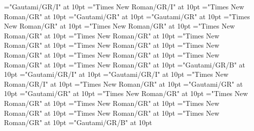 \documentclass[a4paper]{article}
\begin{document}
\font\spanggoTeluINexampleggoTeluINxitemexamplessensesensesentryletData="Gautami/GR/I" at 10pt
\font\spanenexampleggoTeluINxitemexamplessensesensesentryletData="Times New Roman/GR/I" at 10pt
\font\translationsxitemexamplessensesensesentryletData="Times New Roman/GR" at 10pt
\font\translationLdtetranslationsxitemexamplessensesensesentryletData="Gautami/GR" at 10pt
\font\spantetranslationLdtetranslationsxitemexamplessensesensesentryletData="Gautami/GR" at 10pt
\font\spanentranslationLdtetranslationsxitemexamplessensesensesentryletData="Times New Roman/GR" at 10pt
\font\spanenexamplessensesensesentryletData="Times New Roman/GR" at 10pt
\font\primaryrefsentryletData="Times New Roman/GR" at 10pt
\font\spanenprimaryrefsentryletData="Times New Roman/GR" at 10pt
\font\entryreftypeprimaryrefsentryletData="Times New Roman/GR" at 10pt
\font\LexEntryTypepublishStemEntryTypeAbbreviationPubenentryreftypeprimaryrefsentryletData="Times New Roman/GR" at 10pt
\font\spanenLexEntryTypepublishStemEntryTypeAbbreviationPubenentryreftypeprimaryrefsentryletData="Times New Roman/GR" at 10pt
\font\spanenentryreftypeprimaryrefsentryletData="Times New Roman/GR" at 10pt
\font\entryrefcomponentprimaryrefsentryletData="Times New Roman/GR" at 10pt
\font\aentryrefcomponentprimaryrefsentryletData="Times New Roman/GR" at 10pt
\font\LexEntrypublishStemComponentTargetHeadWordRefggoTeluINaentryrefcomponentprimaryrefsentryletData="Gautami/GR/B" at 10pt
\font\exampleggoTeluINexamplessensesensesentryletData="Gautami/GR/I" at 10pt
\font\spanggoTeluINexampleggoTeluINexamplessensesensesentryletData="Gautami/GR/I" at 10pt
\font\spanenexampleggoTeluINexamplessensesensesentryletData="Times New Roman/GR/I" at 10pt
\font\translationsexamplessensesensesentryletData="Times New Roman/GR" at 10pt
\font\translationLdtetranslationsexamplessensesensesentryletData="Gautami/GR" at 10pt
\font\spantetranslationLdtetranslationsexamplessensesensesentryletData="Gautami/GR" at 10pt
\font\spanentranslationLdtetranslationsexamplessensesensesentryletData="Times New Roman/GR" at 10pt
\font\complexformrefsentryletData="Times New Roman/GR" at 10pt
\font\complexformtypecomplexformrefsentryletData="Times New Roman/GR" at 10pt
\font\LexEntryTypepublishStemComplexFormTypeReverseAbbrPubencomplexformtypecomplexformrefsentryletData="Times New Roman/GR" at 10pt
\font\spanenLexEntryTypepublishStemComplexFormTypeReverseAbbrPubencomplexformtypecomplexformrefsentryletData="Times New Roman/GR" at 10pt
\font\spanencomplexformtypecomplexformrefsentryletData="Times New Roman/GR" at 10pt
\font\complexformformggoTeluINcomplexformrefsentryletData="Gautami/GR/B" at 10pt
\end{document}
